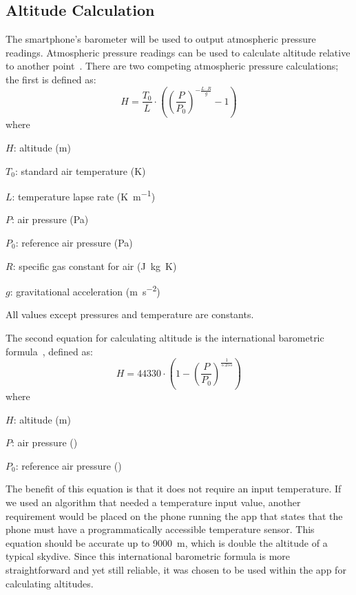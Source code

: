 \subsection{Altitude Calculation}\label{subsec:altitude-calc-design}
The smartphone's barometer will be used to output atmospheric pressure readings. Atmospheric pressure readings can be used to calculate altitude relative to another point~\cite{he_atmospheric_2012, liu_beyond_2014}. There are two competing atmospheric pressure calculations; the first is defined as:
\begin{equation}\label{eq:altitude-calculation}
  H = \frac{T_0}{L} \cdot \left({\left(\frac{P}{P_0}\right)}^{-\frac{L \cdot R}{g}} - 1\right)
\end{equation}
where
\begin{description}
  \item $H$: altitude (\si{\metre})
  \item $T_0$: standard air temperature (\si{\kelvin})
  \item $L$: temperature lapse rate (\si{\kelvin\per\metre})
  \item $P$: air pressure (\si{\pascal})
  \item $P_0$: reference air pressure (\si{\pascal})
  \item $R$: specific gas constant for air (\si{\joule\kilogram\kelvin})
  \item $g$: gravitational acceleration (\si{\metre\per\second\squared})
\end{description}

All values except pressures and temperature are constants.

The second equation for calculating altitude is the international barometric formula~\cite{bosch_bmp180:_2018}, defined as:
\begin{equation}\label{eq:barometric-fomula}
  H = 44330 \cdot \left(1 - {\left(\frac{P}{P_0}\right)}^{\frac{1}{5.255}}\right)
\end{equation}
where
\begin{description}
  \item $H$: altitude (\si{\metre})
  \item $P$: air pressure (\si{\hPa})
  \item $P_0$: reference air pressure (\si{\hPa})
\end{description}

The benefit of this equation is that it does not require an input temperature. If we used an algorithm that needed a temperature input value, another requirement would be placed on the phone running the app that states that the phone must have a programmatically accessible temperature sensor. This equation should be accurate up to \SI{9000}{\metre}, which is double the altitude of a typical skydive. Since this international barometric formula is more straightforward and yet still reliable, it was chosen to be used within the app for calculating altitudes.

